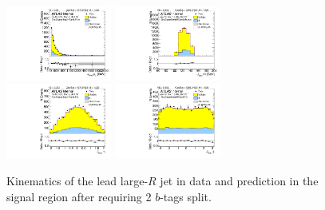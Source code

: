 \clearpage

\begin{figure}[htbp!]
\begin{center}
\includegraphics[width=0.31\textwidth,angle=-90]{figures/boosted/Signal/b77_TwoTag_split_Signal_leadHCand_Pt_m.pdf}
\includegraphics[width=0.31\textwidth,angle=-90]{figures/boosted/Signal/b77_TwoTag_split_Signal_leadHCand_Mass_s.pdf}\\
\includegraphics[width=0.31\textwidth,angle=-90]{figures/boosted/Signal/b77_TwoTag_split_Signal_leadHCand_Eta.pdf}
\includegraphics[width=0.31\textwidth,angle=-90]{figures/boosted/Signal/b77_TwoTag_split_Signal_leadHCand_Phi.pdf}
  \caption{Kinematics of the lead large-$R$ jet in data and prediction in the signal region after requiring 2 $b$-tags split. }
  \label{fig:boosted-2bs-signal-ak10-lead}
\end{center}
\end{figure}

